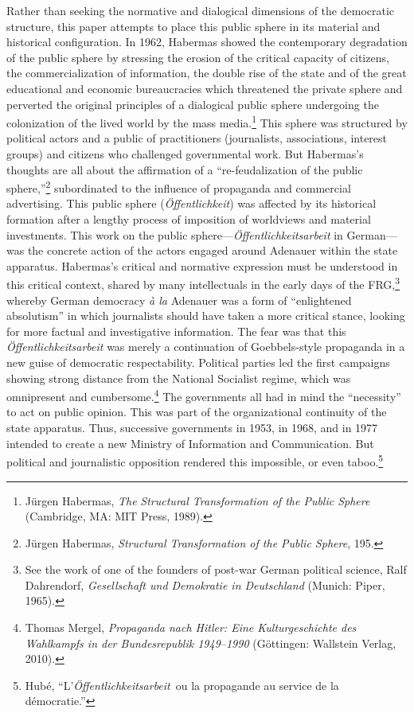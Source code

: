 \documentclass{tufte-handout}
\begin{document}
Rather than seeking the normative and dialogical dimensions of the
democratic structure, this paper attempts to place this public sphere in
its material and historical configuration. In 1962, Habermas showed the
contemporary degradation of the public sphere by stressing the erosion
of the critical capacity of citizens, the commercialization of
information, the double rise of the state and of the great educational
and economic bureaucracies which threatened the private sphere and
perverted the original principles of a dialogical public sphere
undergoing the colonization of the lived world by the mass
media.\footnote{Jürgen Habermas, \emph{The} \emph{Structural
  Transformation of the Public Sphere} (Cambridge, MA: MIT Press, 1989).}
This sphere was structured by political actors and a public of
practitioners (journalists, associations, interest groups) and citizens
who challenged governmental work. But Habermas's thoughts are all about
the affirmation of a ``re-feudalization of the public
sphere,''\footnote{Jürgen Habermas, \emph{Structural Transformation of
  the Public Sphere}, 195.} subordinated to the influence of propaganda
and commercial advertising. This public sphere (\emph{Öffentlichkeit})
was affected by its historical formation after a lengthy process of
imposition of worldviews and material investments. This work on the
public sphere---\emph{Öffentlichkeitsarbeit} in German---was the
concrete action of the actors engaged around Adenauer within the state
apparatus. Habermas's critical and normative expression must be
understood in this critical context, shared by many intellectuals in the
early days of the FRG,\footnote{See the work of one of the founders of
  post-war German political science, Ralf Dahrendorf, \emph{Gesellschaft
  und Demokratie in Deutschland} (Munich: Piper, 1965).} whereby German
democracy \emph{à la} Adenauer was a form of ``enlightened absolutism''
in which journalists should have taken a more critical stance, looking
for more factual and investigative information. The fear was that this
\emph{Öffentlichkeitsarbeit} was merely a continuation of Goebbels-style
propaganda in a new guise of democratic respectability. Political
parties led the first campaigns showing strong distance from the
National Socialist regime, which was omnipresent and
cumbersome.\footnote{Thomas Mergel, \emph{Propaganda nach Hitler: Eine
  Kulturgeschichte des Wahlkampfs in der Bundesrepublik 1949--1990}
  (Göttingen: Wallstein Verlag, 2010).} The governments all had in mind
the ``necessity'' to act on public opinion. This was part of the
organizational continuity of the state apparatus. Thus, successive
governments in 1953, in 1968, and in 1977 intended to create a new
Ministry of Information and Communication. But political and
journalistic opposition rendered this impossible, or even
taboo.\footnote{Hubé, ``L'\emph{Öffentlichkeitsarbeit}~ou la propagande
  au service de la démocratie.''}
\end{document}
